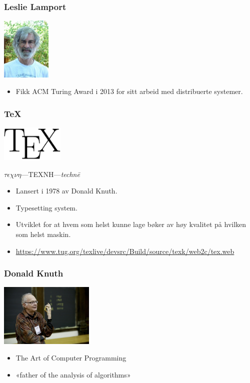 \documentclass[10pt]{beamer}
\begin{document}
\begin{frame}\frametitle{Leslie Lamport}

\begin{center}
\includegraphics[height=3cm]{img/lamport.jpg}
\end{center}

\begin{itemize}
	\item
	Fikk ACM Turing Award i 2013 for sitt arbeid med distribuerte systemer.
\end{itemize}
\end{frame}

\begin{frame}\frametitle{\TeX}

\begin{center}
\includegraphics[width=3cm]{img/texlogo.png}

$\tau \epsilon \chi \nu \eta$---TEXNH---\textit{technē}
\end{center}

\begin{itemize}
	\item
	Lansert i 1978 av Donald Knuth.
	\item
	Typesetting system.
	\item
	Utviklet for at hvem som helst kunne lage bøker av høy kvalitet på hvilken som helst maskin.
	\item
	\url{https://www.tug.org/texlive/devsrc/Build/source/texk/web2c/tex.web}
\end{itemize}
\end{frame}

\begin{frame}\frametitle{Donald Knuth}

\begin{center}
\includegraphics[height=3cm]{img/knuth.jpg}
\end{center}

\begin{itemize}
	\item
	The Art of Computer Programming
	\item
	«father of the analysis of algorithms»
\end{itemize}
\end{frame}
\end{document}
